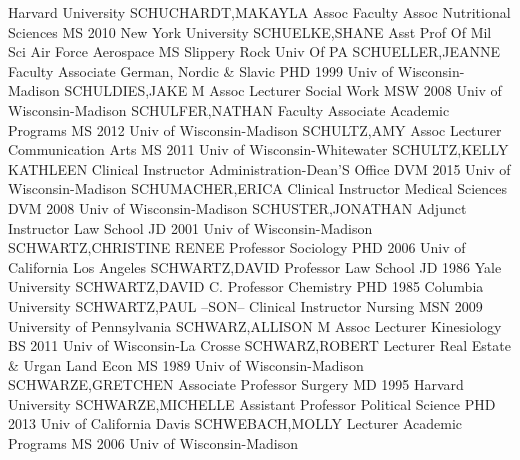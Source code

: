 \documentclass[
]{article}
\begin{document}
Harvard University \textbar{}  \textbar SCHUCHARDT,MAKAYLA
\textbar Assoc Faculty Assoc \textbar Nutritional Sciences \textbar MS
2010 New York University \textbar{}  \textbar SCHUELKE,SHANE
\textbar Asst Prof Of Mil Sci \textbar Air Force Aerospace \textbar MS
Slippery Rock Univ Of PA \textbar{} 
\textbar SCHUELLER,JEANNE \textbar Faculty Associate \textbar German,
Nordic \& Slavic \textbar PHD 1999 Univ of Wisconsin-Madison \textbar{}
 \textbar SCHULDIES,JAKE M \textbar Assoc Lecturer
\textbar Social Work \textbar MSW 2008 Univ of Wisconsin-Madison
\textbar{}  \textbar SCHULFER,NATHAN \textbar Faculty
Associate \textbar Academic Programs \textbar MS 2012 Univ of
Wisconsin-Madison \textbar{}  \textbar SCHULTZ,AMY
\textbar Assoc Lecturer \textbar Communication Arts \textbar MS 2011
Univ of Wisconsin-Whitewater \textbar{} 
\textbar SCHULTZ,KELLY KATHLEEN \textbar Clinical Instructor
\textbar Administration-Dean'S Office \textbar DVM 2015 Univ of
Wisconsin-Madison \textbar{}  \textbar SCHUMACHER,ERICA
\textbar Clinical Instructor \textbar Medical Sciences \textbar DVM 2008
Univ of Wisconsin-Madison \textbar{} 
\textbar SCHUSTER,JONATHAN \textbar Adjunct Instructor \textbar Law
School \textbar JD 2001 Univ of Wisconsin-Madison \textbar{}
 \textbar SCHWARTZ,CHRISTINE RENEE \textbar Professor
\textbar Sociology \textbar PHD 2006 Univ of California Los Angeles
\textbar{}  \textbar SCHWARTZ,DAVID \textbar Professor
\textbar Law School \textbar JD 1986 Yale University \textbar{}
 \textbar SCHWARTZ,DAVID C. \textbar Professor
\textbar Chemistry \textbar PHD 1985 Columbia University \textbar{}
 \textbar SCHWARTZ,PAUL --SON-- \textbar Clinical Instructor
\textbar Nursing \textbar MSN 2009 University of Pennsylvania \textbar{}
 \textbar SCHWARZ,ALLISON M \textbar Assoc Lecturer
\textbar Kinesiology \textbar BS 2011 Univ of Wisconsin-La Crosse
\textbar{}  \textbar SCHWARZ,ROBERT \textbar Lecturer
\textbar Real Estate \& Urgan Land Econ \textbar MS 1989 Univ of
Wisconsin-Madison \textbar{}  \textbar SCHWARZE,GRETCHEN
\textbar Associate Professor \textbar Surgery \textbar MD 1995 Harvard
University \textbar{}  \textbar SCHWARZE,MICHELLE
\textbar Assistant Professor \textbar Political Science \textbar PHD
2013 Univ of California Davis \textbar{} 
\textbar SCHWEBACH,MOLLY \textbar Lecturer \textbar Academic Programs
\textbar MS 2006 Univ of Wisconsin-Madison \textbar{} 
\end{document}
